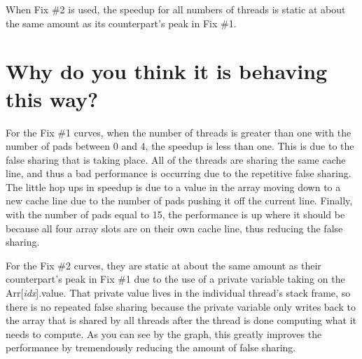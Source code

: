 \documentclass[onecolumn,draftclsnofoot, 10pt, compsoc]{IEEEtran}
\begin{document}
	When Fix \#2 is used, the speedup for all numbers of threads is static at about the same amount as its counterpart's peak in Fix \#1.
	
\section{Why do you think it is behaving this way?}
	For the Fix \#1 curves, when the number of threads is greater than one with the number of pads between 0 and 4, the speedup is less than one. This is due to the false sharing that is taking place. All of the threads are sharing the same cache line, and thus a bad performance is occurring due to the repetitive false sharing. The little hop ups in speedup is due to a value in the array moving down to a new cache line due to the number of pads pushing it off the current line. Finally, with the number of pads equal to 15, the performance is up where it should be because all four array slots are on their own cache line, thus reducing the false sharing.
	
	For the Fix \#2 curves, they are static at about the same amount as their counterpart's peak in Fix \#1 due to the use of a private variable taking on the Arr[\textit{idx}].value. That private value lives in the individual thread's stack frame, so there is no repeated false sharing because the private variable only writes back to the array that is shared by all threads after the thread is done computing what it needs to compute. As you can see by the graph, this greatly improves the performance by tremendously reducing the amount of false sharing.
\end{document}

